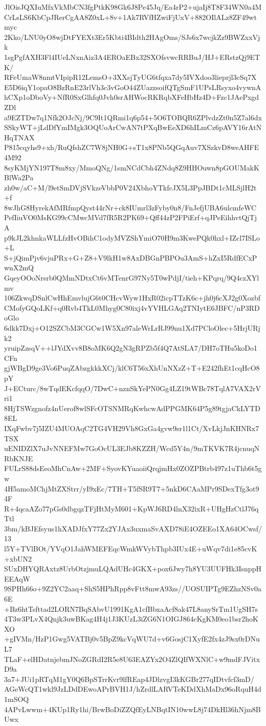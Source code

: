 JlOisJQXIuMfxVkMbCN3fgPtkK98Gk6J8Pe45Jq/Ea4rP2+ujaIj8T8F34WN0a4M
CrLsLS6KbCpJRerCgAA8Z0xL+8v+1Ak7RVfHZwiFjUxV+882OIlALz8ZF49wtmyc
2Kko/LNU0yO8wjDtFYEXt3Er5Kbti4BIdth2HAgOms/SJs6x7wcjkZz9BWZxxVjk
1sgPgfAXH3Fl4IUeLNxnAiz3A4EROaEBx32SXOfsvwcRRBuJ/HJ+ERstzQj9ETK/
RFeUmaW8nmtVIpipR12LemsO+3XXsjTyUG6tfqxa7dy5IVXdoo3lieprjl3cSq7X
E5D6iqY1opaO8BzRnE23rlVh3c3vGoO44ZUazzsoifQTgSmF1UPsLRsyxo4vywnA
hCXp1oDboVy+NfR0SxGlhfq0Jvh0srAHWocRKRqbXFeHbHz4D+Fzc1JAePxgdZDl
a9EZTDw7q1Nfk2OJcNj/9C9It1QRmi1q6p54+5O6TOBQR6ZPlvdzZt0n5Z7al6dx
SSkyWT+jLdDfYmIMgk3OQUoArCwAN7tPXqBwEeXD6hILmCz6pAVY16rAtNHqTNAX
P815cqyhs9+xh/RuQfshZC7W8jNH0G+sT1x8PNb5QGqAuv7XSzkvD8weAHFE4M92
8syKMjYN197T8m8xy/MmoQNg/1smNCdCbh4ZNdq8Z9HHOuwn8pGOUMakKBlWa2Pa
zh0w/aC+M/l9etSmDVjSVkzeVbbP0V24XbhoYTkfcJX5L3PpJBDt1cMLSjlH2t+f
8wJhG8HyrekAfMRfmpQyst44rNr+ck8IUmrl3zFyby0n8/FnJefjUBA6ulcmfeWC
PefIiuVO0MsKG99cCMwcMVd7fR5R2PK69+Qff44zP2FPiErf+qJPeEihhvtQjTjA
p9kJL2khnkaWLLfzHvOBihC1odyMVZShYmiO70H9m3KwePQk0hxl+IZcl7ISLo+L
S+jQimPjv6vjuPRx+G+Z8+V9lkH1w8AxDBGnPBPOu3AmS+hZxI5RdfECxPwnX2mQ
GqeyOOoNrsrb0QMmNDtxCt6vMTenrG97Ny5T0wPdjI/tieh+KPqrq/9Q4czXYlmv
106ZkwqDSnlCwHhEmvlujG6t0CHcvWyw1HxR02icpTTzK6c+jh0j6cXJ2g0Xozbf
CMofyGQoLKf+q0Rvb4TkL0Mhyg0C80ixj4vYVHLGAq2TNIytE6JBFC/nP3RDoGlo
6dkk7Dxj+O12SZCbM3CGCw1W5Xn97aleWrLrRJ99nu1Xd7PCloOlec+5HrjURjk2
yruipZzsqV++lJYdXvv8B8oMK6Q2gN3gRPZb5f4Q7AtSLA7/DH7oTHu5koDo1CFn
gjWBgD9ge3Vo6PuqZAbzgkkkXCj/klC6T56xXhUnNXzZ+T+E242fhEt1cqHcO8pY
J+ECturc/8wTqdEKcfqqO/7DwC+nznSkYePN0Gg4LZ19tWBc78TqlA7VAX2rVri1
8HjTSWzgnofz4nUerof8wlSFcOTSNMRqKwhcwAdPPGMK64P5g89tgjaCkLYTD8EL
IXqFwbv7j5IZU4MUOAqC2TG4VH29Vh8GxGa4gvw9sr1l1Ct/XvLkjJnKHNRx7TSX
uENIDZlX7uJvNNEFMw7GoOcUL3EJb8KZZH/Wcd5Y4n/9mTKVK7R4jcnuqNRbKNJE
FULrS88dsEeoMhCnAw+2MF+SyovKYuaoiiQrqjmHx0ZOZPBtrb497z1uThb6t5gw
4H5amoMChjMtZXStrr/yI9xEc/7TH+T5fSR9T7+5nkD6CAaMPr9SDexTfg3ot94F
R+4qcaAZo77pGs0dbgqzTFjHtMyM601+KpWJ6RD4lnX32ixR+UHgHzCtlJ76qTtl
3bm/kBJEfsyus1hXADJfxY77Zx2YJAx3uxmaSvAXD78iE4OZEEo1XA64OCwsf/13
l5Y+TVlBOt/YVqO1JahWMEFEqcWmkWVybThpb3IUx4E+uWqv7di1e85cvK+xbUN2
SUxDHYQRAxtz8UrbOtzjmuLQAdUHc4GKX+pox6Jwy7h8YU3UUFHk3IsnppHEEAqW
9SPHh66o+9Z2YC2aaq+ShS5HPhRpp8vFtt8mwA93zs//UOSUIPTg9EZhzNSv0a6E
+Bz6htTsfttad2LORN7BqSAbvU1991KgA1cfBbxaAcf8ak47L8anySrTm1UgSH7s
4T3w3PLvX4Qnjk3uwBKag4H4j1J3KUzL3iZG6N1OIGJ864cKgKM0eo1bsr2hoKXO
+gIVMn/HzP1Gwg5VATBj0v5BpZ9kcVqWU7d+v6GosjC1XyfE2fx4zJ9sx0rDNuL7
TLaF+elHDatnjebmJNoZGRdI2R5e8U63EAZYx2O4ZlQIfWXNlC+w9mdFJVitxD9a
3a7+JUi1pRTqM1gY0Q6BpSTrrKvr9lfREap4JDlzvgI3kKGBr277qIDtvfcf3mD/
AGeWcQT1wkl9JzLDdDEwoAPrBVH1J/hZrdlLARVTeKDdXhMaDx96oRquH4d1mSOQ
4APvLwwm+4KUp1Ry1hi/BrwBoDiZZQfEyLNBqtIN10wwL8j74DkHl36hNjm8BUwx

